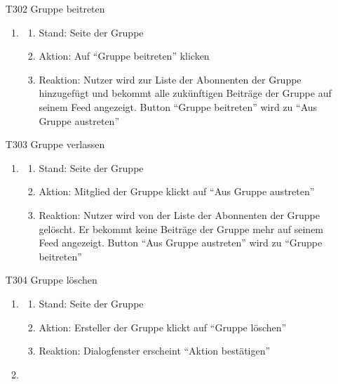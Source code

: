\documentclass[parskip=full]{scrartcl}
\begin{document}
\begin{itemize}
		\item[T302] Gruppe beitreten
		\begin{enumerate}
			\item
			
			\begin{enumerate}[nosep]
				\item Stand: Seite der Gruppe
				\item Aktion:  Auf “Gruppe beitreten” klicken
				\item Reaktion:  Nutzer wird zur Liste der \gls{Abonnenten} der Gruppe hinzugefügt und bekommt alle zukünftigen Beiträge der Gruppe auf seinem \gls{Feed} angezeigt. \gls{Button} “Gruppe beitreten” wird zu “Aus Gruppe austreten”
			\end{enumerate}
			
		\end{enumerate}
		
		\item[T303] Gruppe verlassen
		\begin{enumerate}
			\item
			
			\begin{enumerate}[nosep]
				\item Stand: Seite der Gruppe
				\item Aktion:  Mitglied der Gruppe klickt auf “Aus Gruppe austreten”
				\item Reaktion:   Nutzer wird von der Liste der \gls{Abonnenten} der Gruppe gelöscht. Er bekommt keine Beiträge der Gruppe mehr auf seinem \gls{Feed} angezeigt. \gls{Button} “Aus Gruppe austreten” wird zu “Gruppe beitreten”
			\end{enumerate}
			
		\end{enumerate}		
		
		\newpage
		\item[T304] Gruppe löschen
		\begin{enumerate}
			\item
			
			\begin{enumerate}[nosep]
				\item Stand: Seite der Gruppe
				\item Aktion: Ersteller der Gruppe klickt auf “Gruppe löschen”
				\item Reaktion: Dialogfenster erscheint “Aktion bestätigen”
			\end{enumerate}
			
			\item
			

\end{enumerate}
\end{itemize}
\end{document}
